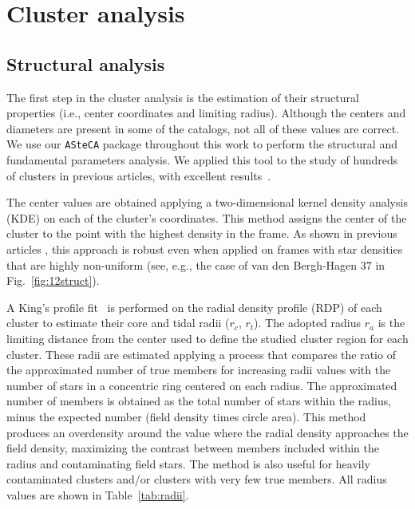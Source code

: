 \documentclass{aa}
\begin{document}
\section{Cluster analysis}
 \label{sec:clust_analy}

 \subsection{Structural analysis}

  The first step in the cluster analysis is the estimation of their structural
  properties (i.e., center coordinates and limiting radius). Although the centers and
  diameters are present in some of the catalogs, not all of these values are
  correct. We use our \texttt{ASteCA} package throughout this
  work to perform the structural and fundamental parameters analysis. We 
  applied this tool to the study of hundreds of clusters in previous articles,
  with excellent results~\citep{Perren_2017,Perren_2020}.

  The center values are obtained applying a two-dimensional kernel density
  analysis (KDE) on each of the cluster's coordinates. This method assigns the
  center of the cluster to the point with the highest density in the frame. As
  shown in previous articles \citep{Perren_2015,Perren_2017,Perren_2020}, this
  approach is robust even when applied on frames with star densities that
  are highly non-uniform (see, e.g., the case of van den Bergh-Hagen 37
  in Fig.~\ref{fig:12struct}).

  A King's profile fit~\citep{King_1962}  is performed on the radial
  density profile (RDP) of each cluster to estimate their core and
  tidal radii ($r_{c}$, $r_{t}$). The adopted radius $r_{a}$ is the limiting
  distance from the center used to define the studied cluster region for each
  cluster. These radii are estimated applying a process that compares the
  ratio of the approximated number of true members for increasing radii values
  with the number of stars in a concentric ring centered on each radius. The
  approximated number of members is obtained as the total number of stars within
  the radius, minus the expected number (field density times circle area). This
  method produces an overdensity around the value where the radial density
  approaches the field density, maximizing the contrast between members included
  within the radius and contaminating field stars. The method is also useful
  for heavily contaminated clusters and/or clusters with very few true
  members. All radius values are shown in Table~\ref{tab:radii}.\\
\end{document}

